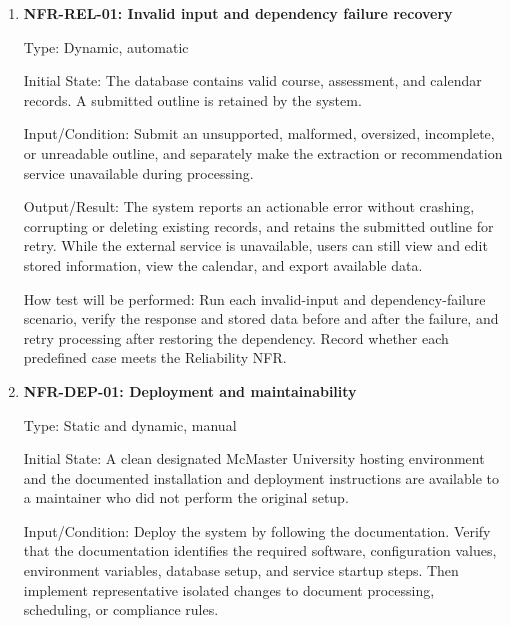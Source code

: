 \documentclass[12pt, titlepage]{article}
\begin{document}
\begin{enumerate}
How test will be performed: Process the batch while capturing outbound
connections, then compare every destination with the configured model
endpoint. Search the logged model requests for master course sheet values and
user account details. Inspect the deployment configuration for any external
model endpoint or storage location, and compare the results with the hosting
and model input privacy requirements in the SRS.

\item{\label{NFR-REL-01}\textbf{NFR-REL-01: Invalid input and dependency failure recovery}\\}

Type: Dynamic, automatic

Initial State: The database contains valid course, assessment, and calendar
records. A submitted outline is retained by the system.

Input/Condition: Submit an unsupported, malformed, oversized, incomplete, or
unreadable outline, and separately make the extraction or recommendation
service unavailable during processing.

Output/Result: The system reports an actionable error without crashing,
corrupting or deleting existing records, and retains the submitted outline
for retry. While the external service is unavailable, users can still view
and edit stored information, view the calendar, and export available data.

How test will be performed: Run each invalid-input and dependency-failure
scenario, verify the response and stored data before and after the failure,
and retry processing after restoring the dependency. Record whether each
predefined case meets the Reliability NFR.

\item{\label{NFR-DEP-01}\textbf{NFR-DEP-01: Deployment and maintainability}\\}

Type: Static and dynamic, manual

Initial State: A clean designated McMaster University hosting environment and
the documented installation and deployment instructions are available to a
maintainer who did not perform the original setup.

Input/Condition: Deploy the system by following the documentation. Verify
that the documentation identifies the required software, configuration
values, environment variables, database setup, and service startup steps.
Then implement representative isolated changes to document processing,
scheduling, or compliance rules.


\end{enumerate}
\end{document}

